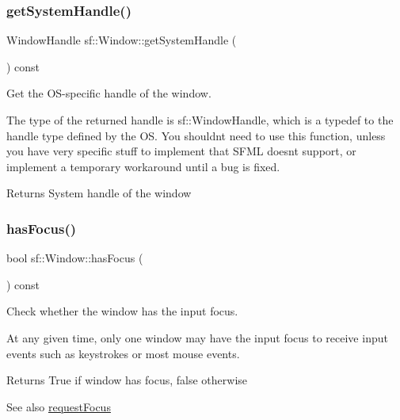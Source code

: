 \subsubsection{\texorpdfstring{get\+System\+Handle()}{getSystemHandle()}}
{\footnotesize\ttfamily Window\+Handle sf\+::\+Window\+::get\+System\+Handle (\begin{DoxyParamCaption}{ }\end{DoxyParamCaption}) const}



Get the O\+S-\/specific handle of the window. 

The type of the returned handle is sf\+::\+Window\+Handle, which is a typedef to the handle type defined by the OS. You shouldn\textquotesingle{}t need to use this function, unless you have very specific stuff to implement that S\+F\+ML doesn\textquotesingle{}t support, or implement a temporary workaround until a bug is fixed.

\begin{DoxyReturn}{Returns}
System handle of the window 
\end{DoxyReturn}
\mbox{\label{classsf_1_1_window_ad8db2e6500d13ca9396281296404ba31}} 
\subsubsection{\texorpdfstring{has\+Focus()}{hasFocus()}}
{\footnotesize\ttfamily bool sf\+::\+Window\+::has\+Focus (\begin{DoxyParamCaption}{ }\end{DoxyParamCaption}) const}



Check whether the window has the input focus. 

At any given time, only one window may have the input focus to receive input events such as keystrokes or most mouse events.

\begin{DoxyReturn}{Returns}
True if window has focus, false otherwise 
\end{DoxyReturn}
\begin{DoxySeeAlso}{See also}
\hyperlink{classsf_1_1_window_a58cf7fa1775e8e7542032e3ecfa83b49}{request\+Focus} 
\end{DoxySeeAlso}
\mbox{\label{classsf_1_1_window_ae873503db7d48157bb9cbf6129562bce}} 
